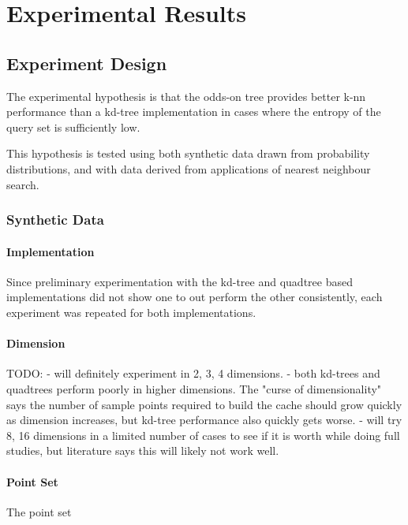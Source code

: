 \documentclass[mcs]{scsthesis}
\begin{document}
\chapter{Experimental Results}

\section{Experiment Design}

The experimental hypothesis is that the odds-on tree provides better k-nn
performance than a kd-tree implementation in cases where the entropy of the
query set is sufficiently low.

This hypothesis is tested using both synthetic data drawn from probability
distributions, and with data derived from applications of nearest neighbour
search. 

\subsection{Synthetic Data}

\subsubsection{Implementation}

Since preliminary experimentation with the kd-tree and quadtree based
implementations did not show one to out perform the other consistently, each
experiment was repeated for both implementations.

\subsubsection{Dimension}

TODO:
- will definitely experiment in 2, 3, 4 dimensions.
- both kd-trees and quadtrees perform poorly in higher dimensions.  The "curse
of dimensionality" says the number of sample points required to build the cache
should grow quickly as dimension increases, but kd-tree performance also quickly
gets worse.
- will try 8, 16 dimensions in a limited number of cases to see if it is worth
while doing full studies, but literature says this will likely not work well.

\subsubsection{Point Set}

The point set
\end{document}

